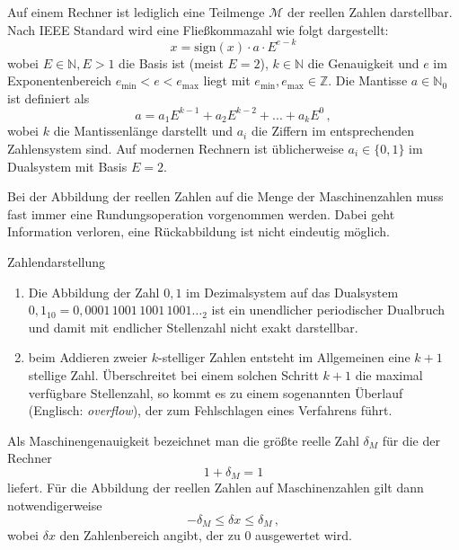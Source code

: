 Auf einem Rechner ist lediglich eine Teilmenge $\mathcal{M}$ der reellen Zahlen darstellbar.
Nach IEEE Standard wird eine Fließkommazahl wie folgt dargestellt:
\begin{equation}
x = \mathrm{sign}(x)\cdot a\cdot E^{e-k}
\end{equation}
wobei $E\in \mathbb{N}, E>1$ die Basis ist (meist $E=2$), $k\in \mathbb{N}$ die Genauigkeit und $e$ im Exponentenbereich $e_\mathrm{min}<e<e_\mathrm{max}$ liegt mit $e_\mathrm{min},e_\mathrm{max}\in \mathbb{Z}$.
Die Mantisse $a\in \mathbb{N}_0$ ist  definiert als
\begin{equation}
a = a_1 E^{k-1} + a_2 E^{k-2} + ... + a_k E^0\,,
\end{equation}
wobei $k$ die Mantissenlänge darstellt und $a_i$ die Ziffern im
entsprechenden Zahlensystem sind. Auf modernen Rechnern ist
üblicherweise $a_i\in\{0,1\}$ im Dualsystem mit Basis $E=2$.

Bei der Abbildung der reellen Zahlen auf die Menge der Maschinenzahlen
muss fast immer eine Rundungsoperation vorgenommen werden. Dabei geht
Information verloren, eine Rückabbildung ist nicht eindeutig möglich.

\begin{myexampleblock}{Zahlendarstellung}
  \begin{enumerate}
    \item Die Abbildung der Zahl $0{,}1$ im Dezimalsystem auf das
    Dualsystem $0{,}1_{10} = 0{,}0001\,1001\,1001\,1001\ldots_2$ ist ein unendlicher
    periodischer Dualbruch und damit mit endlicher Stellenzahl nicht
    exakt darstellbar.
  \item beim Addieren zweier $k$-stelliger Zahlen entsteht im
    Allgemeinen eine $k+1$ stellige Zahl. Überschreitet bei einem
    solchen Schritt $k+1$ die maximal verfügbare Stellenzahl, so kommt
    es zu einem sogenannten Überlauf (Englisch: \emph{overflow}), der
    zum Fehlschlagen eines Verfahrens führt.
  \end{enumerate}
\end{myexampleblock}
Als Maschinengenauigkeit bezeichnet man die größte reelle Zahl $\delta_M$ für die der Rechner
\begin{equation}
1 + \delta_M = 1
\end{equation}
liefert.
Für die Abbildung der reellen Zahlen auf Maschinenzahlen gilt dann notwendigerweise
\begin{equation}
-\delta_M \leq \delta x\leq \delta_M\,,
\end{equation}
wobei $\delta x$ den Zahlenbereich angibt, der zu $0$ ausgewertet wird.


